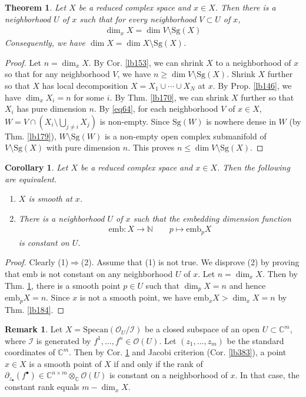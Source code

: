 \documentclass[12pt,b5paper,notitlepage]{report}
\theoremstyle{definition}
\newtheorem{rem}[df]{Remark}
\theoremstyle{plain}
\newtheorem{thm}[df]{Theorem}
\newtheorem{co}[df]{Corollary}
\newcommand{\mc}{\mathcal}
\newcommand{\scr}{\mathscr}
\newcommand{\blt}{\bullet}
\newcommand{\Cbb}{\mathbb C}
\newcommand{\Nbb}{\mathbb N}
\newcommand{\Specan}{\mathrm{Specan}}
\newcommand{\emb}{\mathrm{emb}}
\newcommand{\Sg}{\mathrm{Sg}}
\numberwithin{equation}{section}
\begin{document}
\begin{thm}\label{lb231}
Let $X$ be a reduced complex space and $x\in X$. Then there is a neighborhood $U$ of $x$ such that for every neighborhood $V\subset U$ of $x$, 
\begin{align}
\dim_xX=\dim V\setminus\Sg(X)
\end{align}
Consequently, we have $\dim X=\dim X\setminus\Sg(X)$.
\end{thm}

\begin{proof}
Let $n=\dim_xX$. By Cor. \ref{lb153}, we can shrink $X$ to a neighborhood of $x$ so that for any neighborhood $V$, we have $n\geq\dim V\setminus\Sg(X)$. Shrink $X$ further so that $X$ has local decomposition $X=X_1\cup\cdots\cup X_N$ at $x$. By Prop. \ref{lb146}, we have $\dim_x X_i=n$ for some $i$. By Thm. \ref{lb170}, we can shrink $X$ further so that $X_i$ has pure dimension $n$. By \eqref{eq64}, for each neighborhood $V$ of $x\in X$, $W=V\cap(X_i\setminus\bigcup_{j\neq i}X_j)$ is non-empty. Since $\Sg(W)$ is nowhere dense in $W$ (by Thm. \ref{lb179}), $W\setminus\Sg(W)$ is a non-empty open complex submanifold of $V\setminus\Sg(X)$ with pure dimension $n$. This proves $n\leq\dim V\setminus\Sg(X)$.
\end{proof}


\begin{co}\label{lb382}
Let $X$ be a reduced complex space and $x\in X$. Then the following are equivalent.
\begin{enumerate}[label=(\arabic*)]
\item $X$ is smooth at $x$.
\item There is a neighborhood $U$ of $x$ such that the embedding dimension function
\begin{align*}
\emb:X\rightarrow\Nbb\qquad p\mapsto \emb_p X
\end{align*}
is constant on $U$.
\end{enumerate}
\end{co}


\begin{proof}
Clearly (1)$\Rightarrow$(2). Assume that (1) is not true. We disprove (2) by proving that $\emb$ is not constant on any neighborhood $U$ of $x$. Let $n=\dim_xX$. Then by Thm. \ref{lb231}, there is a smooth point $p\in U$ such that $\dim_p X=n$ and hence $\emb_pX=n$. Since $x$ is not a smooth point, we have $\emb_x X>\dim_xX=n$ by Thm. \ref{lb184}.
\end{proof}


\begin{rem}\label{lb385}
Let $X=\Specan(\scr O_U/\mc I)$ be a closed subspace of an open $U\subset\Cbb^m$, where $\mc I$ is generated by $f^1,\dots,f^n\in\scr O(U)$. Let $(z_1,\dots,z_m)$ be the standard coordinates of $\Cbb^m$. Then by Cor. \ref{lb382} and Jacobi criterion (Cor. \ref{lb383}), a point $x\in X$ is a smooth point of $X$ if and only if the rank of $\partial_{z_\blt}(f^\blt)\in\Cbb^{n\times m}\otimes_\Cbb\scr O(U)$ is constant on a neighborhood of $x$. In that case, the constant rank equals $m-\dim_xX$.
\end{rem}
\end{document}
